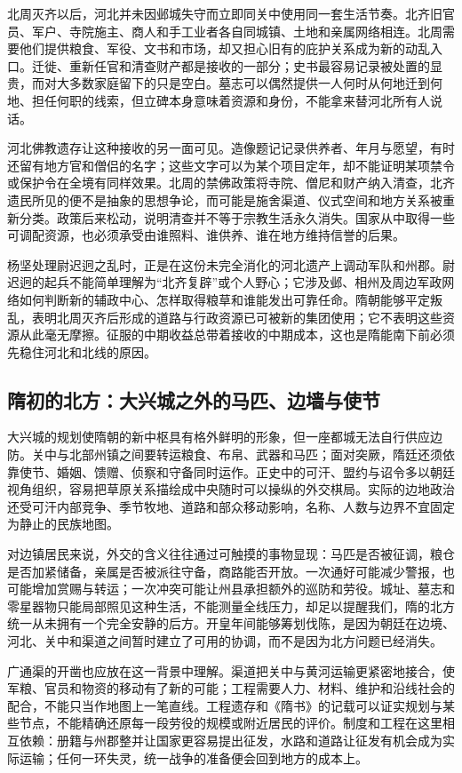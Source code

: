 北周灭齐以后，河北并未因邺城失守而立即同关中使用同一套生活节奏。北齐旧官员、军户、寺院施主、商人和手工业者各自同城镇、土地和亲属网络相连。北周需要他们提供粮食、军役、文书和市场，却又担心旧有的庇护关系成为新的动乱入口。迁徙、重新任官和清查财产都是接收的一部分；史书最容易记录被处置的显贵，而对大多数家庭留下的只是空白。墓志可以偶然提供一人何时从何地迁到何地、担任何职的线索，但立碑本身意味着资源和身份，不能拿来替河北所有人说话。

河北佛教遗存让这种接收的另一面可见。造像题记记录供养者、年月与愿望，有时还留有地方官和僧侣的名字；这些文字可以为某个项目定年，却不能证明某项禁令或保护令在全境有同样效果。北周的禁佛政策将寺院、僧尼和财产纳入清查，北齐遗民所见的便不是抽象的思想争论，而可能是施舍渠道、仪式空间和地方关系被重新分类。政策后来松动，说明清查并不等于宗教生活永久消失。国家从中取得一些可调配资源，也必须承受由谁照料、谁供养、谁在地方维持信誉的后果。

杨坚处理尉迟迥之乱时，正是在这份未完全消化的河北遗产上调动军队和州郡。尉迟迥的起兵不能简单理解为“北齐复辟”或个人野心；它涉及邺、相州及周边军政网络如何判断新的辅政中心、怎样取得粮草和谁能发出可靠任命。隋朝能够平定叛乱，表明北周灭齐后形成的道路与行政资源已可被新的集团使用；它不表明这些资源从此毫无摩擦。征服的中期收益总带着接收的中期成本，这也是隋能南下前必须先稳住河北和北线的原因。

\subsection{隋初的北方：大兴城之外的马匹、边墙与使节}

大兴城的规划使隋朝的新中枢具有格外鲜明的形象，但一座都城无法自行供应边防。关中与北部州镇之间要转运粮食、布帛、武器和马匹；面对突厥，隋廷还须依靠使节、婚姻、馈赠、侦察和守备同时运作。正史中的可汗、盟约与诏令多以朝廷视角组织，容易把草原关系描绘成中央随时可以操纵的外交棋局。实际的边地政治还受可汗内部竞争、季节牧地、道路和部众移动影响，名称、人数与边界不宜固定为静止的民族地图。

对边镇居民来说，外交的含义往往通过可触摸的事物显现：马匹是否被征调，粮仓是否加紧储备，亲属是否被派往守备，商路能否开放。一次通好可能减少警报，也可能增加赏赐与转运；一次冲突可能让州县承担额外的巡防和劳役。城址、墓志和零星器物只能局部照见这种生活，不能测量全线压力，却足以提醒我们，隋的北方统一从未拥有一个完全安静的后方。开皇年间能够筹划伐陈，是因为朝廷在边境、河北、关中和渠道之间暂时建立了可用的协调，而不是因为北方问题已经消失。

广通渠的开凿也应放在这一背景中理解。渠道把关中与黄河运输更紧密地接合，使军粮、官员和物资的移动有了新的可能；工程需要人力、材料、维护和沿线社会的配合，不能只当作地图上一笔直线。工程遗存和《隋书》的记载可以证实规划与某些节点，不能精确还原每一段劳役的规模或附近居民的评价。制度和工程在这里相互依赖：册籍与州郡整并让国家更容易提出征发，水路和道路让征发有机会成为实际运输；任何一环失灵，统一战争的准备便会回到地方的成本上。


